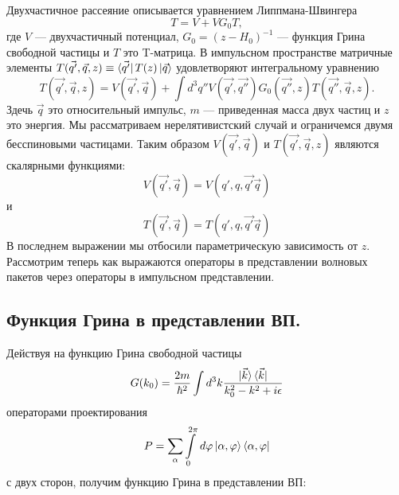 \documentclass[a4paper,12pt]{article}
\begin{document}
Двухчастичное рассеяние описывается уравнением Липпмана-Швингера
\begin{equation}
    T = V + V G_0 T,
\end{equation}
где $V$ — двухчастичный потенциал, $G_0 = (z - H_0)^{-1}$ — функция Грина свободной частицы и $T$ это T-матрица. В импульсном пространстве матричные элементы $T(\vec{q'},\vec{q},z) \equiv \bra{\vec{q'}}T(z)\ket{\vec{q}}$  удовлетворяют интегральному уравнению
\begin{equation}
    T(\vec{q'},\vec{q}, z) = V(\vec{q'},\vec{q}) + \int d^3q'' V(\vec{q'},\vec{q''}) G_0(\vec{q''},z) T(\vec{q''},\vec{q}, z). 
\end{equation}
Здечь $\vec{q}$ это относительный импульс, $m$ — приведенная масса двух частиц и $z$ это энергия. Мы рассматриваем нерелятивистский случай и ограничемся двумя бесспиновыми частицами. Таким образом $V(\vec{q'},\vec{q})$ и $T(\vec{q'},\vec{q},z)$ являются скалярными функциями:
\begin{equation}
    V(\vec{q'},\vec{q}) = V(q',q,\vec{q'}\vec{q})
\end{equation}
и
\begin{equation}
    T(\vec{q'},\vec{q}) = T(q',q,\vec{q'}\vec{q})
\end{equation}
В последнем выражении мы отбосили параметрическую зависимость от $z$. Рассмотрим теперь как выражаются операторы в представлении волновых пакетов через операторы в импульсном представлении.


\subsection{Функция Грина в представлении ВП.}
Действуя на функцию Грина свободной частицы
\[
	G(k_0) = \frac{2m}{\hbar^2} \int d^3k \frac{ \ket{\vec{k}} \bra{ \vec{k} } }{ k_0^2 - k^2 + i\epsilon } 
\]
операторами проектирования
\[
	P = \sum\limits_\alpha \int\limits_0^{2\pi} \,d \varphi \ket{\alpha,\varphi}\bra{\alpha,\varphi}
\] 
с двух сторон, получим функцию Грина в представлении ВП:
\end{document}
